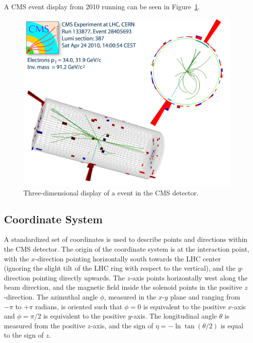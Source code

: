 A CMS event display from 2010 running can be seen in Figure~\ref{fig:EventDisplay}.  

 \begin{figure}[htb]
  \begin{center}
    \includegraphics[width=360pt]{Figures/zee-133877-28405693-full.png}
  \end{center}
  \caption[\fixspacing Three-dimensional display of a \Zee event in the CMS detector]
	  {\fixspacing Three-dimensional display of a \Zee event in the CMS detector.}
  \label{fig:EventDisplay}
 \end{figure}

\subsection{Coordinate System} %
\label{exp:coords}
A standardized set of coordinates is used to describe points and directions within the CMS detector.  
The origin of the coordinate system is at the interaction point,
with the $x$-direction pointing horizontally south towards the LHC center
(ignoring the slight tilt of the LHC ring with respect to the vertical),
and the $y$-direction pointing directly upwards.  
The $z$-axis points horizontally west along the beam direction,
and the magnetic field inside the solenoid points in the positive $z$-direction.  
The azimuthal angle $\phi$, measured in the $x$-$y$ plane and ranging from $-\pi$ to $+\pi$ radians, 
is oriented such that $ \phi = 0 $ is equivalent to the positive $x$-axis
and $ \phi = \pi/2 $ is equivalent to the positive $y$-axis.  
The longitudinal angle $\theta$ is measured from the positive $z$-axis, 
and the sign of $ \eta = -\ln\tan(\theta/2)$ is equal to the sign of $z$.  

